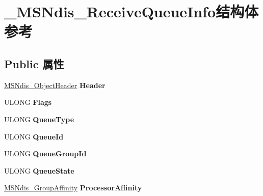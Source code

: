 \hypertarget{struct___m_s_ndis___receive_queue_info}{}\section{\+\_\+\+M\+S\+Ndis\+\_\+\+Receive\+Queue\+Info结构体 参考}
\label{struct___m_s_ndis___receive_queue_info}
\subsection*{Public 属性}
\begin{DoxyCompactItemize}
\item 
\mbox{\label{struct___m_s_ndis___receive_queue_info_a2264ea4aed4f3f8554f8c0a24b5a31f9}} 
\hyperlink{struct___m_s_ndis___object_header}{M\+S\+Ndis\+\_\+\+Object\+Header} {\bfseries Header}
\item 
\mbox{\label{struct___m_s_ndis___receive_queue_info_ab41deec82d2e24c3bb2bf261cc3d332c}} 
U\+L\+O\+NG {\bfseries Flags}
\item 
\mbox{\label{struct___m_s_ndis___receive_queue_info_af7370e63e854e23c948bdf496c0d352b}} 
U\+L\+O\+NG {\bfseries Queue\+Type}
\item 
\mbox{\label{struct___m_s_ndis___receive_queue_info_ac824a81ab21f9e13882f7c86c9c69e0d}} 
U\+L\+O\+NG {\bfseries Queue\+Id}
\item 
\mbox{\label{struct___m_s_ndis___receive_queue_info_aaee2cfbafcc731395813bd0830539fa7}} 
U\+L\+O\+NG {\bfseries Queue\+Group\+Id}
\item 
\mbox{\label{struct___m_s_ndis___receive_queue_info_a87e17001443c3ad5082abe83f44d4c07}} 
U\+L\+O\+NG {\bfseries Queue\+State}
\item 
\mbox{\label{struct___m_s_ndis___receive_queue_info_af9fc7b0f801a27c2228c74ada18e6536}} 
\hyperlink{struct___m_s_ndis___group_affinity}{M\+S\+Ndis\+\_\+\+Group\+Affinity} {\bfseries Processor\+Affinity}

\end{DoxyCompactItemize}
